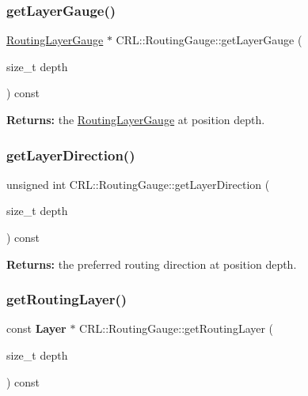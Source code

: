 \subsubsection{\texorpdfstring{get\+Layer\+Gauge()}{getLayerGauge()}\hspace{0.1cm}{\footnotesize\ttfamily [2/2]}}
{\footnotesize\ttfamily \hyperlink{classCRL_1_1RoutingLayerGauge}{Routing\+Layer\+Gauge} $\ast$ C\+R\+L\+::\+Routing\+Gauge\+::get\+Layer\+Gauge (\begin{DoxyParamCaption}\item[{size\+\_\+t}]{depth }\end{DoxyParamCaption}) const}

{\bfseries Returns\+:} the \hyperlink{classCRL_1_1RoutingLayerGauge}{Routing\+Layer\+Gauge} at position {\ttfamily depth}. \mbox{\label{classCRL_1_1RoutingGauge_ab237249b41f605947765118cd1c59635}} 
\subsubsection{\texorpdfstring{get\+Layer\+Direction()}{getLayerDirection()}\hspace{0.1cm}{\footnotesize\ttfamily [2/2]}}
{\footnotesize\ttfamily unsigned int C\+R\+L\+::\+Routing\+Gauge\+::get\+Layer\+Direction (\begin{DoxyParamCaption}\item[{size\+\_\+t}]{depth }\end{DoxyParamCaption}) const\hspace{0.3cm}{\ttfamily [inline]}}

{\bfseries Returns\+:} the preferred routing direction at position {\ttfamily depth}. \mbox{\label{classCRL_1_1RoutingGauge_a6d6c1951c8728886d3fb702891685b94}} 
\subsubsection{\texorpdfstring{get\+Routing\+Layer()}{getRoutingLayer()}}
{\footnotesize\ttfamily const \textbf{ Layer} $\ast$ C\+R\+L\+::\+Routing\+Gauge\+::get\+Routing\+Layer (\begin{DoxyParamCaption}\item[{size\+\_\+t}]{depth }\end{DoxyParamCaption}) const}

